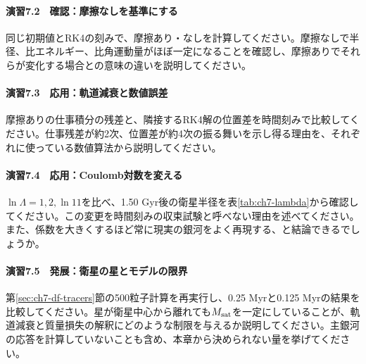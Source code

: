 \paragraph{演習7.2　確認：摩擦なしを基準にする}
同じ初期値とRK4の刻みで、摩擦あり・なしを計算してください。摩擦なしで半径、比エネルギー、比角運動量がほぼ一定になることを確認し、摩擦ありでそれらが変化する場合との意味の違いを説明してください。

\paragraph{演習7.3　応用：軌道減衰と数値誤差}
摩擦ありの仕事積分の残差と、隣接するRK4解の位置差を時間刻みで比較してください。仕事残差が約2次、位置差が約4次の振る舞いを示し得る理由を、それぞれに使っている数値算法から説明してください。

\paragraph{演習7.4　応用：Coulomb対数を変える}
$\ln\Lambda=1,2,\ln11$を比べ、1.50 Gyr後の衛星半径を表\ref{tab:ch7-lambda}から確認してください。この変更を時間刻みの収束試験と呼べない理由を述べてください。また、係数を大きくするほど常に現実の銀河をよく再現する、と結論できるでしょうか。

\paragraph{演習7.5　発展：衛星の星とモデルの限界}
第\ref{sec:ch7-df-tracers}節の500粒子計算を再実行し、0.25 Myrと0.125 Myrの結果を比較してください。星が衛星中心から離れても$M_{\rm sat}$を一定にしていることが、軌道減衰と質量損失の解釈にどのような制限を与えるか説明してください。主銀河の応答を計算していないことも含め、本章から決められない量を挙げてください。

